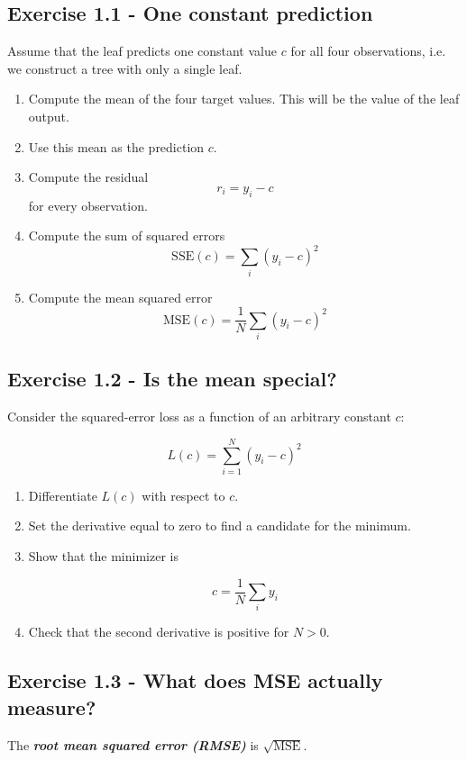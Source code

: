 \documentclass{course_sheet}
\begin{document}
\subsection*{Exercise 1.1 - One constant prediction}
Assume that the leaf predicts one constant value $c$ for all four observations, i.e. we construct a tree with only a single leaf.

\begin{enumerate}
\item
Compute the mean of the four target values. This will be the value of the leaf output.

\item
Use this mean as the prediction $c$.

\item
Compute the residual
\[
r_i = y_i-c
\]
for every observation.

\item
Compute the sum of squared errors
\[
\mathrm{SSE}(c)=\sum_i (y_i-c)^2
\]

\item
Compute the mean squared error
\[
\mathrm{MSE}(c)=\frac{1}{N}\sum_i (y_i-c)^2
\]

\end{enumerate}
\subsection*{Exercise 1.2 - Is the mean special?}
Consider the squared-error loss as a function of an arbitrary constant $c$:

\[
L(c)=\sum_{i=1}^{N}(y_i-c)^2
\]

\begin{enumerate}
\item
Differentiate $L(c)$ with respect to $c$.

\item
Set the derivative equal to zero to find a candidate for the minimum.

\item
Show that the minimizer is

\[
c=\frac{1}{N}\sum_i y_i
\]

\item
Check that the second derivative is positive for $N>0$.

\end{enumerate}
\subsection*{Exercise 1.3 - What does MSE actually measure?}
The \textbf{\textit{root mean squared error (RMSE)}} is $\sqrt{\mathrm{MSE}}$.
\end{document}
